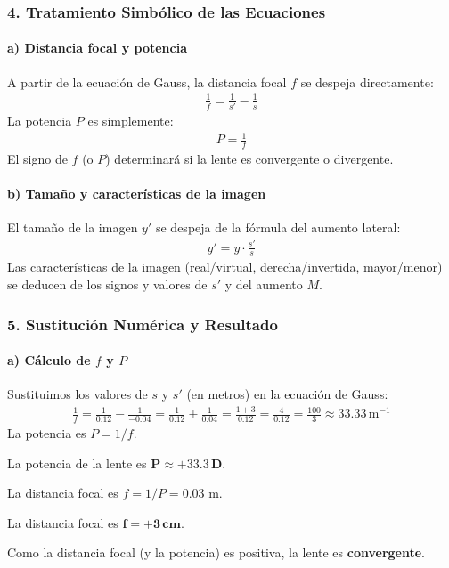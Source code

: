 \subsubsection*{4. Tratamiento Simbólico de las Ecuaciones}
\paragraph*{a) Distancia focal y potencia}
A partir de la ecuación de Gauss, la distancia focal $f$ se despeja directamente:
\begin{gather}
    \frac{1}{f} = \frac{1}{s'} - \frac{1}{s}
\end{gather}
La potencia $P$ es simplemente:
\begin{gather}
    P = \frac{1}{f}
\end{gather}
El signo de $f$ (o $P$) determinará si la lente es convergente o divergente.

\paragraph*{b) Tamaño y características de la imagen}
El tamaño de la imagen $y'$ se despeja de la fórmula del aumento lateral:
\begin{gather}
    y' = y \cdot \frac{s'}{s}
\end{gather}
Las características de la imagen (real/virtual, derecha/invertida, mayor/menor) se deducen de los signos y valores de $s'$ y del aumento $M$.

\subsubsection*{5. Sustitución Numérica y Resultado}
\paragraph*{a) Cálculo de $f$ y $P$}
Sustituimos los valores de $s$ y $s'$ (en metros) en la ecuación de Gauss:
\begin{gather}
    \frac{1}{f} = \frac{1}{0.12} - \frac{1}{-0.04} = \frac{1}{0.12} + \frac{1}{0.04} = \frac{1+3}{0.12} = \frac{4}{0.12} = \frac{100}{3} \approx 33.33 \, \text{m}^{-1}
\end{gather}
La potencia es $P = 1/f$.
\begin{cajaresultado}
    La potencia de la lente es $\boldsymbol{P \approx +33.3 \, \textbf{D}}$.
\end{cajaresultado}
La distancia focal es $f = 1/P = 0.03$ m.
\begin{cajaresultado}
    La distancia focal es $\boldsymbol{f = +3 \, \textbf{cm}}$.
\end{cajaresultado}
Como la distancia focal (y la potencia) es positiva, la lente es \textbf{convergente}.

